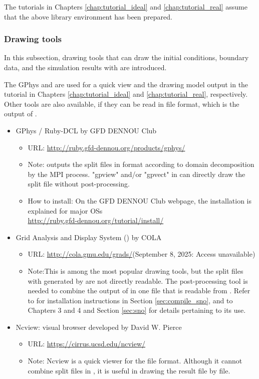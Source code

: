 The tutorials in Chapters \ref{chap:tutorial_ideal} and \ref{chap:tutorial_real} assume that the above library environment has been prepared.



\subsubsection{Drawing tools}

In this subsection, drawing tools that can draw the initial conditions, boundary data, and the simulation results with \scalerm are introduced.

The GPhys and \grads are used for a quick view
and the drawing model output in the tutorial in Chapters \ref{chap:tutorial_ideal} and \ref{chap:tutorial_real}, respectively.
Other tools are also available,
if they can be read in \netcdf file format, which is the output of \scalerm.

\begin{itemize}
\item GPhys / Ruby-DCL by GFD DENNOU Club
 \begin{itemize}
  \item URL: \url{http://ruby.gfd-dennou.org/products/gphys/}
  \item Note: \scalelib outputs the split files
  in {\netcdf} format according to domain decomposition by the MPI process.
  "gpview" and/or "gpvect" in {\gphys} can directly draw the split file without post-processing.
  \item How to install:
  On the GFD DENNOU Club webpage, the installation is explained for major OSs\\
  \url{http://ruby.gfd-dennou.org/tutorial/install/}\\
   \end{itemize}
\item Grid Analysis and Display System (\grads) by COLA
 \begin{itemize}
  \item URL: \url{http://cola.gmu.edu/grads/}(September 8, 2025: Access unavailable)
  \item Note:This is among the most popular drawing tools,
  but the split files with {\netcdf} generated by \scalelib are not directly readable.
  The post-processing tool \sno is needed to combine the output of \scalelib in one file that is readable from \grads.
  Refer to \sno for installation instructions in Section \ref{sec:compile_sno},
  and to Chapters 3 and 4 and Section \ref{sec:sno} for details pertaining to its use.
 \end{itemize}
\item Ncview: {\netcdf} visual browser developed by David W. Pierce
 \begin{itemize}
  \item URL: \url{https://cirrus.ucsd.edu/ncview/}
  \item Note: Ncview is a quick viewer for the {\netcdf} file format.
  Although it cannot combine split files in \scalelib, it is useful in drawing the result file by file.
 \end{itemize}
\end{itemize}


